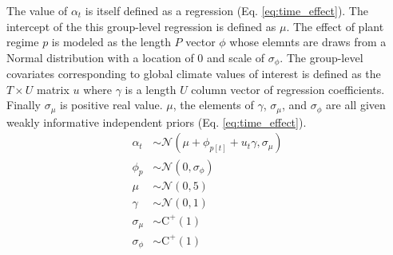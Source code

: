 \documentclass[12pt,letterpaper]{article}
\begin{document}
The value of \(\alpha_{t}\) is itself defined as a regression (Eq. \ref{eq:time_effect}). The intercept of the this group-level regression is defined as \(\mu\). The effect of plant regime \(p\) is modeled as the length \(P\) vector \(\phi\) whose elemnts are draws from a Normal distribution with a location of 0 and scale of \(\sigma_{\phi}\). The group-level covariates corresponding to global climate values of interest is defined as the \(T \times U\) matrix \(u\) where \(\gamma\) is a length \(U\) column vector of regression coefficients. Finally \(\sigma_{\mu}\) is positive real value. \(\mu\), the elements of \(\gamma\), \(\sigma_{\mu}\), and \(\sigma_{\phi}\) are all given weakly informative independent priors (Eq. \ref{eq:time_effect}).
\begin{equation}
  \begin{aligned}
    \alpha_{t} &\sim \mathcal{N}(\mu + \phi_{p[t]} + u_{t} \gamma, \sigma_{\mu}) \\
    \phi_{p} &\sim \mathcal{N}(0, \sigma_{\phi}) \\
    \mu &\sim \mathcal{N}(0, 5) \\
    \gamma &\sim \mathcal{N}(0, 1) \\
    \sigma_{\mu} &\sim \text{C}^{+}(1) \\
    \sigma_{\phi} &\sim \text{C}^{+}(1) \\
  \end{aligned}
  \label{eq:time_effect}
\end{equation}
\end{document}
